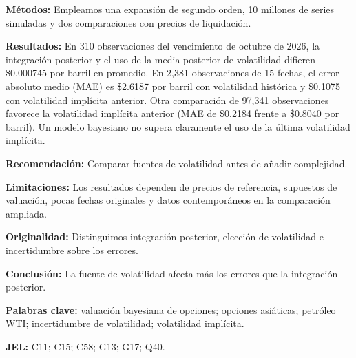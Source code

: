 \textbf{Métodos:} Empleamos una expansión de segundo orden, 10 millones de series simuladas y dos comparaciones con precios de liquidación.

\textbf{Resultados:} En 310 observaciones del vencimiento de octubre de 2026, la integración posterior y el uso de la media posterior de volatilidad difieren \$0.000745 por barril en promedio. En 2,381 observaciones de 15 fechas, el error absoluto medio (MAE) es \$2.6187 por barril con volatilidad histórica y \$0.1075 con volatilidad implícita anterior. Otra comparación de 97,341 observaciones favorece la volatilidad implícita anterior (MAE de \$0.2184 frente a \$0.8040 por barril). Un modelo bayesiano no supera claramente el uso de la última volatilidad implícita.

\textbf{Recomendación:} Comparar fuentes de volatilidad antes de añadir complejidad.

\textbf{Limitaciones:} Los resultados dependen de precios de referencia, supuestos de valuación, pocas fechas originales y datos contemporáneos en la comparación ampliada.

\textbf{Originalidad:} Distinguimos integración posterior, elección de volatilidad e incertidumbre sobre los errores.

\textbf{Conclusión:} La fuente de volatilidad afecta más los errores que la integración posterior.

\textbf{Palabras clave:} valuación bayesiana de opciones; opciones asiáticas; petróleo WTI; incertidumbre de volatilidad; volatilidad implícita.

\textbf{JEL:} C11; C15; C58; G13; G17; Q40.
